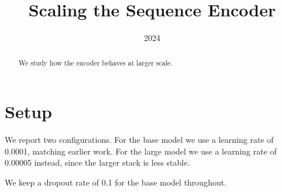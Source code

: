 \documentclass{article}
\title{Scaling the Sequence Encoder}
\date{2024}
\begin{document}
\begin{abstract}
We study how the encoder behaves at larger scale.
\end{abstract}

\section{Setup}
We report two configurations. For the base model we use a learning rate of
0.0001, matching earlier work. For the large model we use a learning rate of
0.00005 instead, since the larger stack is less stable.

We keep a dropout rate of 0.1 for the base model throughout.
\end{document}
